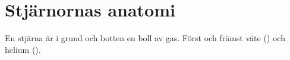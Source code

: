 \section{Stjärnornas anatomi}
En stjärna är i grund och botten en boll av gas. Först och främst väte () och helium ().